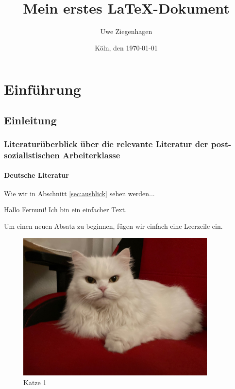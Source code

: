 \documentclass[12pt,ngerman,parskip=half]{scrreport}
\author{Uwe Ziegenhagen}
\title{Mein erstes LaTeX-Dokument}
\date{Köln, den \today} %
\begin{document}
\maketitle

\tableofcontents

\listoffigures

\chapter{Einführung}

\section{Einleitung}
\subsection[Literaturüberblick über die relevante Literatur]{Literaturüberblick über die relevante Literatur der post-sozialistischen Arbeiterklasse}
\subsubsection{Deutsche Literatur}

Wie wir in Abschnitt \ref{sec:ausblick} sehen werden...

Hallo Fernuni!
Ich bin ein einfacher Text.

Um einen neuen Absatz zu beginnen, fügen wir einfach eine Leerzeile ein.



\begin{figure}[b] %
\begin{center}
\includegraphics[width=10cm]{Bilder/Katze}
\end{center}
\caption{Katze 1}\label{fig:katze}
\end{figure}
\end{document}
